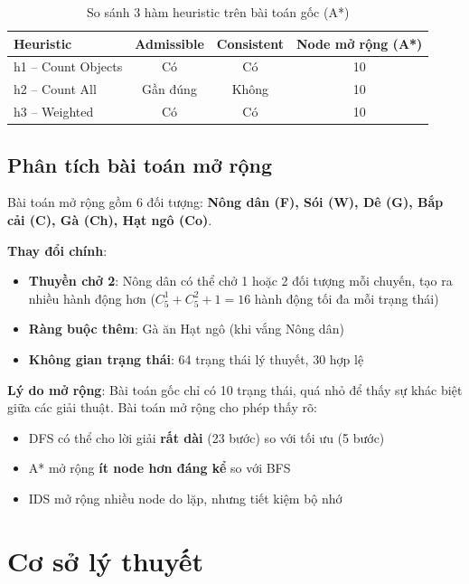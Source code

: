 \documentclass[a4paper,12pt]{article}
\begin{document}
\begin{table}[H]
\centering
\caption{So sánh 3 hàm heuristic trên bài toán gốc (A*)}
\label{tab:heuristic_cmp}
\begin{tabular}{@{}lccc@{}}
\toprule
\textbf{Heuristic} & \textbf{Admissible} & \textbf{Consistent} & \textbf{Node mở rộng (A*)} \\
\midrule
h1 -- Count Objects & Có & Có & 10 \\
h2 -- Count All & Gần đúng & Không & 10 \\
h3 -- Weighted & Có & Có & 10 \\
\bottomrule
\end{tabular}
\end{table}

\subsection{Phân tích bài toán mở rộng}

Bài toán mở rộng gồm 6 đối tượng: \textbf{Nông dân (F), Sói (W), Dê (G), Bắp cải (C), Gà (Ch), Hạt ngô (Co)}.

\textbf{Thay đổi chính}:
\begin{itemize}
    \item \textbf{Thuyền chở 2}: Nông dân có thể chở 1 hoặc 2 đối tượng mỗi chuyến, tạo ra nhiều hành động hơn ($C_5^1 + C_5^2 + 1 = 16$ hành động tối đa mỗi trạng thái)
    \item \textbf{Ràng buộc thêm}: Gà ăn Hạt ngô (khi vắng Nông dân)
    \item \textbf{Không gian trạng thái}: 64 trạng thái lý thuyết, 30 hợp lệ
\end{itemize}

\textbf{Lý do mở rộng}: Bài toán gốc chỉ có 10 trạng thái, quá nhỏ để thấy sự khác biệt giữa các giải thuật. Bài toán mở rộng cho phép thấy rõ:
\begin{itemize}
    \item DFS có thể cho lời giải \textbf{rất dài} (23 bước) so với tối ưu (5 bước)
    \item A* mở rộng \textbf{ít node hơn đáng kể} so với BFS
    \item IDS mở rộng nhiều node do lặp, nhưng tiết kiệm bộ nhớ
\end{itemize}

\section{Cơ sở lý thuyết}
\end{document}

